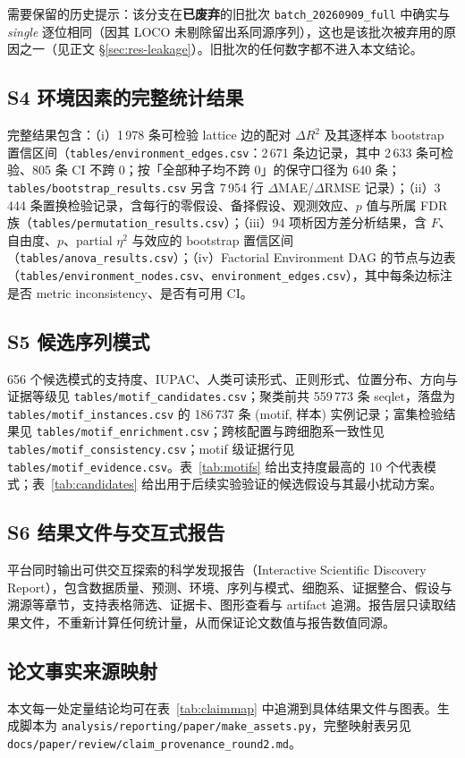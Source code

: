 需要保留的历史提示：该分支在\textbf{已废弃}的旧批次 \texttt{batch\_20260909\_full} 中确实与 \emph{single} 逐位相同（因其 LOCO 未剔除留出系同源序列），这也是该批次被弃用的原因之一（见正文 \S\ref{sec:res-leakage}）。旧批次的任何数字都不进入本文结论。

\subsection*{S4 环境因素的完整统计结果}
完整结果包含：（i）1\,978 条可检验 lattice 边的配对 $\Delta R^{2}$ 及其逐样本 bootstrap 置信区间（\texttt{tables/environment\_edges.csv}：2\,671 条边记录，其中 2\,633 条可检验、805 条 CI 不跨 0；按「全部种子均不跨 0」的保守口径为 640 条；\texttt{tables/bootstrap\_results.csv} 另含 7\,954 行 $\Delta$MAE/$\Delta$RMSE 记录）；（ii）3\,444 条置换检验记录，含每行的零假设、备择假设、观测效应、$p$ 值与所属 FDR 族（\texttt{tables/permutation\_results.csv}）；（iii）94 项析因方差分析结果，含 $F$、自由度、$p$、partial $\eta^{2}$ 与效应的 bootstrap 置信区间（\texttt{tables/anova\_results.csv}）；（iv）Factorial Environment DAG 的节点与边表（\texttt{tables/environment\_nodes.csv}、\texttt{environment\_edges.csv}），其中每条边标注是否 metric inconsistency、是否有可用 CI。

\subsection*{S5 候选序列模式}
656 个候选模式的支持度、IUPAC、人类可读形式、正则形式、位置分布、方向与证据等级见 \texttt{tables/motif\_candidates.csv}；聚类前共 559\,773 条 seqlet，落盘为 \texttt{tables/motif\_instances.csv} 的 186\,737 条 (motif, 样本) 实例记录；富集检验结果见 \texttt{tables/motif\_enrichment.csv}；跨核配置与跨细胞系一致性见 \texttt{tables/motif\_consistency.csv}；motif 级证据行见 \texttt{tables/motif\_evidence.csv}。表~\ref{tab:motifs} 给出支持度最高的 10 个代表模式；表~\ref{tab:candidates} 给出用于后续实验验证的候选假设与其最小扰动方案。

\subsection*{S6 结果文件与交互式报告}
平台同时输出可供交互探索的科学发现报告（Interactive Scientific Discovery Report），包含数据质量、预测、环境、序列与模式、细胞系、证据整合、假设与溯源等章节，支持表格筛选、证据卡、图形查看与 artifact 追溯。报告层只读取结果文件，不重新计算任何统计量，从而保证论文数值与报告数值同源。

\subsection{论文事实来源映射}
\label{app:provenance}
本文每一处定量结论均可在表~\ref{tab:claimmap} 中追溯到具体结果文件与图表。生成脚本为 \texttt{analysis/reporting/paper/make\_assets.py}，完整映射表另见 \texttt{docs/paper/review/claim\_provenance\_round2.md}。

